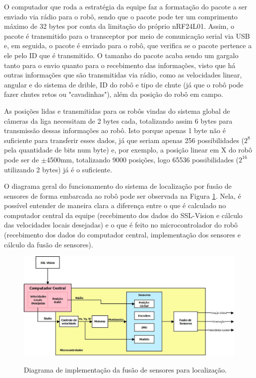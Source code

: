 \documentclass[acronym, symbols, table]{fei}
\begin{document}
		O computador que roda a estratégia da equipe faz a formatação do pacote a ser enviado via rádio para o robô, sendo que o pacote pode ter um comprimento máximo de 32 bytes por conta da limitação do próprio nRF24L01. Assim, o pacote é transmitido para o transceptor por meio de comunicação serial via USB e, em seguida, o pacote é enviado para o robô, que verifica se o pacote pertence a ele pelo ID que é transmitido. O tamanho do pacote acaba sendo um gargalo tanto para o envio quanto para o recebimento das informações, visto que há outras informações que são transmitidas via rádio, como as velocidades linear, angular e do sistema de drible, ID do robô e tipo de chute (já que o robô pode fazer chutes retos ou "cavadinhas"), além da posição do robô em campo.
		
		As posições lidas e transmitidas para os robôs vindas do sistema global de câmeras da liga necessitam de 2 bytes cada, totalizando assim 6 bytes para transmissão dessas informações ao robô. Isto porque apenas 1 byte não é suficiente para transferir esses dados, já que seriam apenas 256 possibilidades ($2^8$ pela quantidade de bits num byte) e, por exemplo, a posição linear em X do robô pode ser de $\pm$4500mm, totalizando 9000 posições, logo 65536 possibilidades ($2^{16}$ utilizando 2 bytes) já é o suficiente.
		
		O diagrama geral do funcionamento do sistema de localização por fusão de sensores de forma embarcada ao robô pode ser observada na Figura \ref{fig:diagrama_implementacao}. Nela, é possível entender de maneira clara a diferença entre o que é calculado no computador central da equipe (recebimento dos dados do SSL-Vision e cálculo das velocidades locais desejadas) e o que é feito no microcontrolador do robô (recebimento dos dados do computador central, implementação dos sensores e cálculo da fusão de sensores).
		
		\begin{figure}[!htb]
			\centering
			\caption{Diagrama de implementação da fusão de sensores para localização.}
			\includegraphics[width=1.00\textwidth]{diagrama_fluxo_implementacao.jpeg}
			\label{fig:diagrama_implementacao}
		\end{figure}
	
\end{document}
